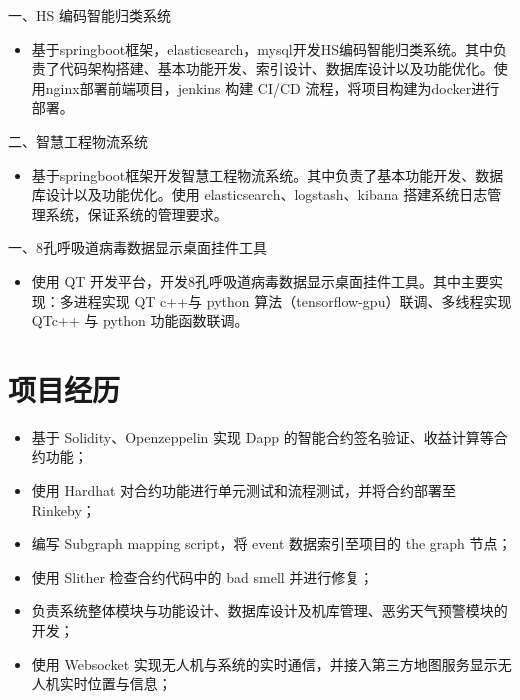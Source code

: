 \documentclass{resume}
\begin{document}
一、HS 编码智能归类系统
\begin{itemize}[parsep=0.5ex]
  \item 基于springboot框架，elasticsearch，mysql开发HS编码智能归类系统。其中负责了代码架构搭建、基本功能开发、索引设计、数据库设计以及功能优化。使用nginx部署前端项目，jenkins 构建 CI/CD 流程，将项目构建为docker进行部署。
\end{itemize}
二、智慧工程物流系统
\begin{itemize}[parsep=0.5ex]
  \item 基于springboot框架开发智慧工程物流系统。其中负责了基本功能开发、数据库设计以及功能优化。使用 elasticsearch、logstash、kibana 搭建系统日志管理系统，保证系统的管理要求。
\end{itemize}

一、8孔呼吸道病毒数据显示桌面挂件工具
\begin{itemize}[parsep=0.5ex]
  \item 使用 QT 开发平台，开发8孔呼吸道病毒数据显示桌面挂件工具。其中主要实现：多进程实现 QT c++与 python 算法（tensorflow-gpu）联调、多线程实现 QTc++ 与 python 功能函数联调。
\end{itemize}

\section{项目经历}
\begin{itemize}[parsep=0.5ex]
  \item 基于 Solidity、Openzeppelin 实现 Dapp 的智能合约签名验证、收益计算等合约功能；
  \item 使用 Hardhat 对合约功能进行单元测试和流程测试，并将合约部署至 Rinkeby；
  \item 编写 Subgraph mapping script，将 event 数据索引至项目的 the graph 节点；
  \item 使用 Slither 检查合约代码中的 bad smell 并进行修复；
\end{itemize}
\begin{itemize}[parsep=0.5ex]
  \item 负责系统整体模块与功能设计、数据库设计及机库管理、恶劣天气预警模块的开发；
  \item 使用 Websocket 实现无人机与系统的实时通信，并接入第三方地图服务显示无人机实时位置与信息；
\end{itemize}
\end{document}
